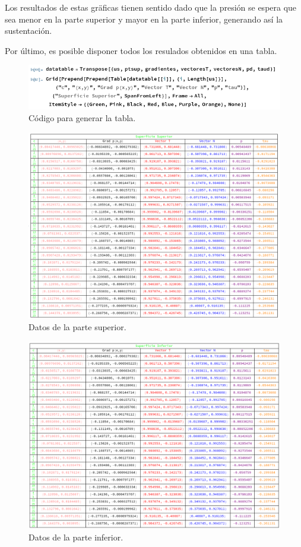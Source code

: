 \documentclass[12pt, letterpaper]{article}
\begin{document}
Los resultados de estas gräficas tienen sentido dado que la presión se espera que sea menor en la parte superior y mayor en la parte inferior, generando así la sustentación.

Por último, es posible disponer todos los resulados obtenidos en una tabla.

\begin{figure}[H]
	\centering
	\includegraphics[width=\textwidth]{19.png}
	\caption{Código para generar la tabla.}
\end{figure}

\begin{figure}[H]
	\centering
	\includegraphics[width=\textwidth]{20.png}
	\caption{Datos de la parte superior.}
\end{figure}

\begin{figure}[H]
	\centering
	\includegraphics[width=\textwidth]{21.png}
	\caption{Datos de la parte inferior.}
\end{figure}
\end{document}

